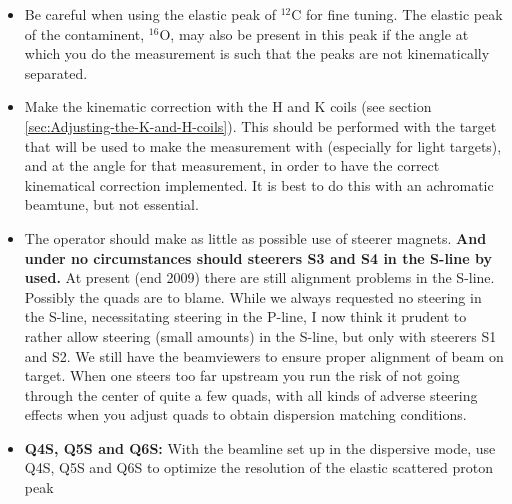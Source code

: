 \documentclass[11pt]{report}
\begin{document}
\begin{itemize}
\item Be careful when using the elastic peak of $^{12}$C for fine tuning.
      The elastic peak of the contaminent, $^{16}$O, may also be present in this peak if the 
      angle at which you do the measurement is such that the peaks are not kinematically separated.
\item Make the kinematic correction with the H and K coils (see section \ref{sec:Adjusting-the-K-and-H-coils}). 
      This should be performed with the target that will be used to
      make the measurement with (especially for light targets), and at the angle 
      for that measurement, in order to have the correct kinematical correction implemented.
      It is best to do this with an achromatic beamtune, but not essential.
\item The operator should make as little as possible use of steerer magnets.
      {\bf And under no circumstances should steerers
      S3 and S4 in the S-line by used.}      
      At present (end 2009) there are still alignment problems in the S-line. Possibly the quads are
      to blame. While we always requested no steering in the S-line, necessitating steering in the 
      P-line, I now think it prudent to rather allow steering (small amounts) in the S-line, but only 
      with steerers S1 and S2. We still have the  beamviewers to ensure proper alignment of beam on target.
      When one steers too far upstream you run the risk of not going through the center of quite a few quads,
      with all kinds of adverse steering effects when you adjust quads to obtain dispersion matching conditions.
\item {\bf Q4S, Q5S  and Q6S:} With the beamline set up in the dispersive mode, use Q4S, Q5S  and Q6S 
      to optimize the resolution of the elastic scattered proton peak 

\end{itemize}
\end{document}
